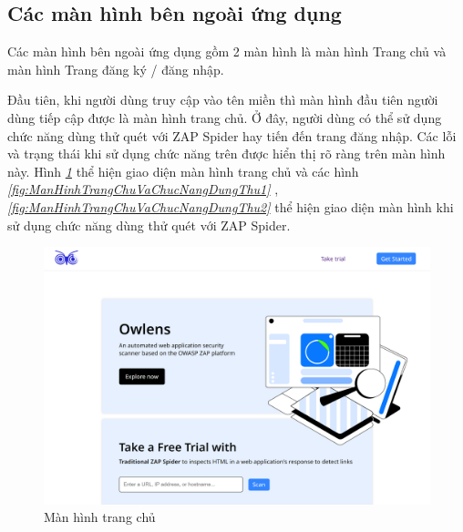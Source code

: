 \subsection{Các màn hình bên ngoài ứng dụng}

\tab Các màn hình bên ngoài ứng dụng gồm 2 màn hình là màn hình Trang chủ và màn hình Trang đăng ký / đăng nhập.

\tab \tab Đầu tiên, khi người dùng truy cập vào tên miền thì màn hình đầu tiên người dùng tiếp cập được là màn hình trang chủ.
Ở đây, người dùng có thể sử dụng chức năng dùng thử quét với ZAP Spider hay tiến đến trang đăng nhập.
Các lỗi và trạng thái khi sử dụng chức năng trên được hiển thị rõ ràng trên màn hình này.
Hình \textit{\ref{fig:ManHinhTrangChu} } 
thể hiện giao diện màn hình trang chủ và các hình \textit{\ref{fig:ManHinhTrangChuVaChucNangDungThu1} }
, \textit{\ref{fig:ManHinhTrangChuVaChucNangDungThu2} } 
thể hiện giao diện màn hình khi sử dụng chức năng dùng thử quét với ZAP Spider.

\begin{figure}[H]
      \centering
      \includegraphics[width=\textwidth]{applied-thesis-chapters/chapter-6/Màn hình trang chủ.png}
      \caption{Màn hình trang chủ}
      \label{fig:ManHinhTrangChu}
\end{figure}


